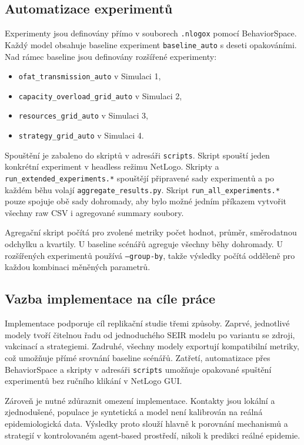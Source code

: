 \documentclass{article}
\begin{document}
\subsection{Automatizace experimentů}

Experimenty jsou definovány přímo v souborech \texttt{.nlogox} pomocí
BehaviorSpace. Každý model obsahuje baseline experiment \texttt{baseline\_auto}
s deseti opakováními. Nad rámec baseline jsou definovány rozšířené experimenty:
\begin{itemize}
\item \texttt{ofat\_transmission\_auto} v Simulaci 1,
\item \texttt{capacity\_overload\_grid\_auto} v Simulaci 2,
\item \texttt{resources\_grid\_auto} v Simulaci 3,
\item \texttt{strategy\_grid\_auto} v Simulaci 4.
\end{itemize}

Spouštění je zabaleno do skriptů v adresáři \texttt{scripts}. Skript
 spouští jeden konkrétní experiment v headless
režimu NetLogo. Skripty  a
\texttt{run\_extended\_experiments.*} spouštějí připravené sady experimentů a
po každém běhu volají \texttt{aggregate\_results.py}. Skript
\texttt{run\_all\_experiments.*} pouze spojuje obě sady dohromady, aby bylo
možné jedním příkazem vytvořit všechny raw CSV i agregované summary soubory.

Agregační skript počítá pro zvolené metriky počet hodnot, průměr, směrodatnou
odchylku a kvartily. U baseline scénářů agreguje všechny běhy dohromady. U
rozšířených experimentů používá \texttt{--group-by}, takže výsledky počítá
odděleně pro každou kombinaci měněných parametrů.

\subsection{Vazba implementace na cíle práce}

Implementace podporuje cíl replikační studie třemi způsoby. Zaprvé, jednotlivé
modely tvoří čitelnou řadu od jednoduchého SEIR modelu po variantu se zdroji,
vakcinací a strategiemi. Zadruhé, všechny modely exportují kompatibilní metriky,
což umožňuje přímé srovnání baseline scénářů. Zatřetí, automatizace přes
BehaviorSpace a skripty v adresáři \texttt{scripts} umožňuje opakované spuštění
experimentů bez ručního klikání v NetLogo GUI.

Zároveň je nutné zdůraznit omezení implementace. Kontakty jsou lokální a
zjednodušené, populace je syntetická a model není kalibrován na reálná
epidemiologická data. Výsledky proto slouží hlavně k porovnání mechanismů a
strategií v kontrolovaném agent-based prostředí, nikoli k predikci reálné
epidemie.
\end{document}
